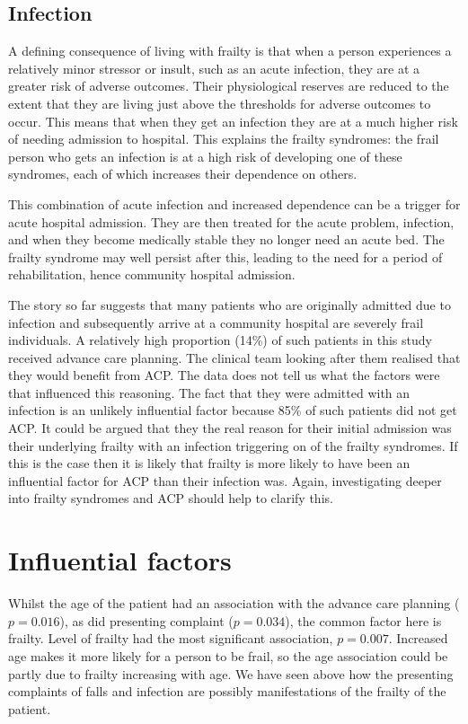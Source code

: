 \documentclass
[
	12pt,
	a4paper,
	oneside,
]{report}
\begin{document}
\subsection{Infection}

A defining consequence of living with frailty is that when a person 
experiences a relatively minor stressor or insult, such as an acute infection, 
they are at a greater risk of adverse outcomes. Their physiological reserves
are reduced to the extent that they are living just above the thresholds 
for adverse outcomes to occur. This means that when they get an infection
they are at a much higher risk of needing admission to hospital. This explains
the frailty syndromes: the frail person who gets an infection is at a high 
risk of developing one of these syndromes, each of which increases their 
dependence on others.

This combination of acute infection and increased dependence can be a trigger
for acute hospital admission. They are then treated for the acute problem,
infection, and when they become medically stable they no longer need an acute
bed. The frailty syndrome may well persist after this, leading to the
need for a period of rehabilitation, hence community hospital admission.

The story so far suggests that many patients who are originally admitted 
due to infection and 
subsequently arrive at a community hospital are severely frail individuals.
A relatively high proportion (14\%) of such patients in this study received
advance care planning. The clinical team looking after them realised that they
would benefit from ACP. The data does not tell us what the factors were that 
influenced this reasoning. The fact that they were admitted with an infection
is an unlikely influential factor because 85\% of such patients did not get
ACP. It could be argued that they the real reason for their initial admission
was their underlying frailty with an infection triggering on of the frailty 
syndromes. If this is the case then it is likely that frailty is more likely 
to have been an influential factor for ACP than their infection was. Again, 
investigating deeper into frailty syndromes and ACP should help to clarify 
this.

\section{Influential factors}

Whilst the age of the patient
had an association with the advance care planning ($p=0.016$), as did 
presenting complaint ($p=0.034$),
the common factor here is frailty. Level of frailty had the most 
significant association, $p=0.007$. Increased age makes it more likely for a 
person to be frail, so the age association could be partly due to frailty
increasing with age. We have seen above how the presenting complaints of 
falls and infection are possibly manifestations of the frailty of the patient.
\end{document}
